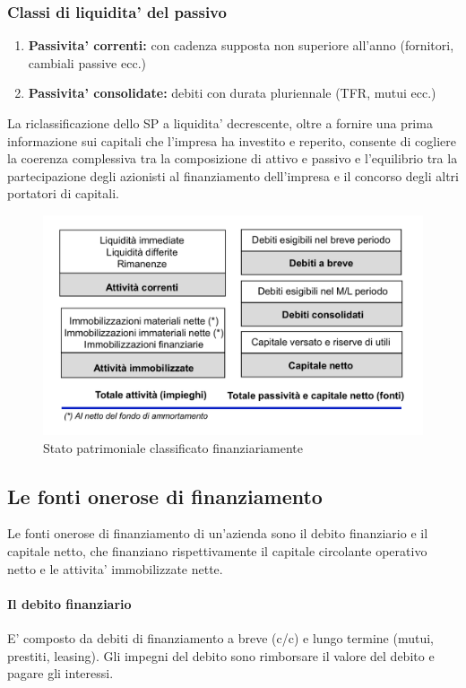 \documentclass{report}
\begin{document}
	\subsubsection{Classi di liquidita' del passivo}
	\begin{enumerate}
		\item \textbf{Passivita' correnti:} con cadenza supposta non superiore all'anno (fornitori, cambiali passive ecc.)
		\item \textbf{Passivita' consolidate:} debiti con durata pluriennale (TFR, mutui ecc.)
	\end{enumerate}
	La riclassificazione dello SP a liquidita' decrescente, oltre a fornire una prima informazione sui capitali che l'impresa ha investito e reperito, consente di cogliere la coerenza complessiva tra la composizione di attivo e passivo e l'equilibrio tra la partecipazione degli azionisti al finanziamento dell'impresa e il concorso degli altri portatori di capitali.
	\newline
	\begin{figure}[h]
		\centering
		\includegraphics[width=0.7\linewidth]{sp}
		\caption{Stato patrimoniale classificato finanziariamente}
		\label{fig:sp}
	\end{figure}
	\subsection{Le fonti onerose di finanziamento}
	Le fonti onerose di finanziamento di un'azienda sono il debito finanziario e il capitale netto, che finanziano rispettivamente il capitale circolante operativo netto e le attivita' immobilizzate nette.
	\paragraph{Il debito finanziario} E' composto da debiti di finanziamento a breve (c/c) e lungo termine (mutui, prestiti, leasing). Gli impegni del debito sono rimborsare il valore del debito e pagare gli interessi.
\end{document}
